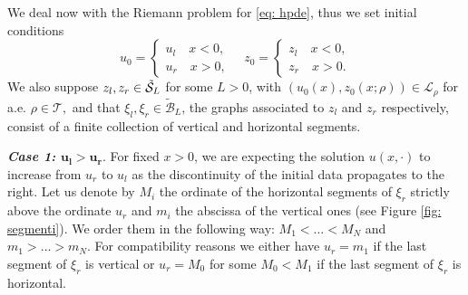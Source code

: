 \documentclass[12pt]{article}
\newcommand{\LL}{\mathcal{L}}
\newcommand{\T}{\mathcal{T}}
\newcommand{\p}{\rho}
\newcommand{\1}{\mathds{1}}
\theoremstyle{definition}
\begin{document}
We deal now with the Riemann problem for \eqref{eq: hpde}, thus we set initial conditions 
\begin{equation}\label{eq: datiR}
u_0= \begin{cases}
    u_l \quad x<0,\\
    u_r \quad x>0,
\end{cases} \quad z_0= \begin{cases}
    z_l \quad x<0,\\
    z_r \quad x>0.
\end{cases}
\end{equation}
We also suppose $z_l,z_r\in\tilde{\cal S}_L$ for some $L>0$, with $(u_0(x),z_0(x;\p))\in \LL_\p$ for a.e. $\p\in\T,$ and that $\xi_l,\xi_r\in \tilde{\mathcal B}_L$, the graphs associated to $z_l$ and $z_r$ respectively, consist of a finite collection of vertical and horizontal segments.
\par \textit{\textbf{Case 1: $\mathbf{u_l>u_r}.$}}
For fixed $x>0$, we are expecting the solution $u(x,\cdot)$ to increase from $u_r$ to $u_l$ as the discontinuity of the initial data propagates to the right. 
Let us denote by $M_i$ the ordinate of the horizontal segments of $\xi_r$ strictly above the ordinate $u_r$ and $m_i$ the abscissa of the vertical ones (see Figure \ref{fig: segmenti}). We order them in the following way: $M_1< \dots < M_N$ and $m_1> \dots > m_N$. For compatibility reasons we either have $u_r = m_1$ if the last segment of $\xi_r$ is vertical or $u_r=M_0$ for some $M_0< M_1$ if the last segment of $\xi_r$ is horizontal. 
\end{document}
